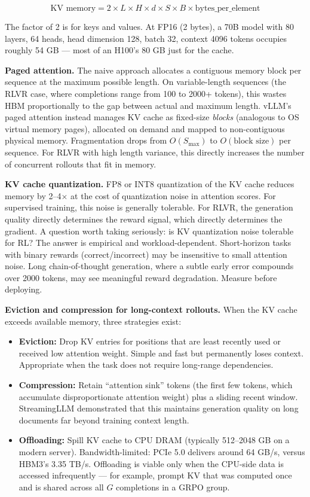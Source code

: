 $$\text{KV memory} = 2 \times L \times H \times d \times S \times B \times \text{bytes\_per\_element}$$

The factor of 2 is for keys and values. At FP16 (2 bytes), a 70B model with 80 layers, 64 heads, head dimension 128, batch 32, context 4096 tokens occupies roughly 54 GB --- most of an H100's 80 GB just for the cache.

\textbf{Paged attention.} The naive approach allocates a contiguous memory block per sequence at the maximum possible length. On variable-length sequences (the RLVR case, where completions range from 100 to 2000+ tokens), this wastes HBM proportionally to the gap between actual and maximum length. vLLM's paged attention instead manages KV cache as fixed-size \textit{blocks} (analogous to OS virtual memory pages), allocated on demand and mapped to non-contiguous physical memory. Fragmentation drops from $O(S_\text{max})$ to $O(\text{block size})$ per sequence. For RLVR with high length variance, this directly increases the number of concurrent rollouts that fit in memory.

\textbf{KV cache quantization.} FP8 or INT8 quantization of the KV cache reduces memory by 2--4$\times$ at the cost of quantization noise in attention scores. For supervised training, this noise is generally tolerable. For RLVR, the generation quality directly determines the reward signal, which directly determines the gradient. A question worth taking seriously: is KV quantization noise tolerable for RL? The answer is empirical and workload-dependent. Short-horizon tasks with binary rewards (correct/incorrect) may be insensitive to small attention noise. Long chain-of-thought generation, where a subtle early error compounds over 2000 tokens, may see meaningful reward degradation. Measure before deploying.

\textbf{Eviction and compression for long-context rollouts.} When the KV cache exceeds available memory, three strategies exist:
\begin{itemize}
  \item \textbf{Eviction:} Drop KV entries for positions that are least recently used or received low attention weight. Simple and fast but permanently loses context. Appropriate when the task does not require long-range dependencies.
  \item \textbf{Compression:} Retain ``attention sink'' tokens (the first few tokens, which accumulate disproportionate attention weight) plus a sliding recent window. StreamingLLM demonstrated that this maintains generation quality on long documents far beyond training context length.
  \item \textbf{Offloading:} Spill KV cache to CPU DRAM (typically 512--2048 GB on a modern server). Bandwidth-limited: PCIe 5.0 delivers around 64 GB/s, versus HBM3's 3.35 TB/s. Offloading is viable only when the CPU-side data is accessed infrequently --- for example, prompt KV that was computed once and is shared across all $G$ completions in a GRPO group.
\end{itemize}

